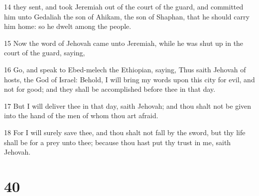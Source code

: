 \par 14 they sent, and took Jeremiah out of the court of the guard, and committed him unto Gedaliah the son of Ahikam, the son of Shaphan, that he should carry him home: so he dwelt among the people.
\par 15 Now the word of Jehovah came unto Jeremiah, while he was shut up in the court of the guard, saying,
\par 16 Go, and speak to Ebed-melech the Ethiopian, saying, Thus saith Jehovah of hosts, the God of Israel: Behold, I will bring my words upon this city for evil, and not for good; and they shall be accomplished before thee in that day.
\par 17 But I will deliver thee in that day, saith Jehovah; and thou shalt not be given into the hand of the men of whom thou art afraid.
\par 18 For I will surely save thee, and thou shalt not fall by the sword, but thy life shall be for a prey unto thee; because thou hast put thy trust in me, saith Jehovah.

\chapter{40}

